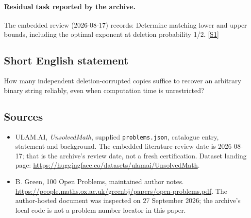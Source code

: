 \documentclass[11pt,a4paper]{article}
\newcommand{\sref}[2]{\hyperlink{source:#1:#2}{[S#2]}}
\begin{document}
\paragraph{Residual task reported by the archive.}

The embedded review (2026-08-17) records: Determine matching lower and upper bounds, including the optimal exponent at deletion probability 1/2. \sref{statement}{1}

\subsection{Short English statement}

How many independent deletion-corrupted copies suffice to recover an arbitrary binary string reliably, even when computation time is unrestricted?

\subsection{Sources}

{\small

\begin{itemize}

\item[\hypertarget{source:statement:1}{S1}] ULAM.AI, \emph{UnsolvedMath}, supplied \texttt{problems.json}, catalogue entry, statement and background. The embedded literature-review date is 2026-08-17; that is the archive’s review date, not a fresh certification. Dataset landing page: \url{https://huggingface.co/datasets/ulamai/UnsolvedMath}.

\item[\hypertarget{source:statement:2}{S2}] B. Green, 100 Open Problems, maintained author notes. \url{https://people.maths.ox.ac.uk/greenbj/papers/open-problems.pdf}. The author-hosted document was inspected on 27 September 2026; the archive’s local code is not a problem-number locator in this paper.

\end{itemize}

}

\label{end:statement}
\end{document}
